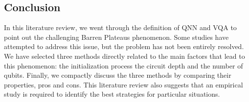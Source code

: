 \subsection{Conclusion}
In this literature review, we went through the definition of QNN and VQA to point out the challenging Barren Plateaus phenomenon. 
Some studies have attempted to address this issue, but the problem has not been entirely resolved.
We have selected three methods directly related to the main factors that lead to this phenomenon: the initialization process the circuit depth and the number of qubits.
Finally, we compactly discuss the three methods by comparing their properties, pros and cons.
This literature review also suggests that an empirical study is required to identify the best strategies for particular situations.